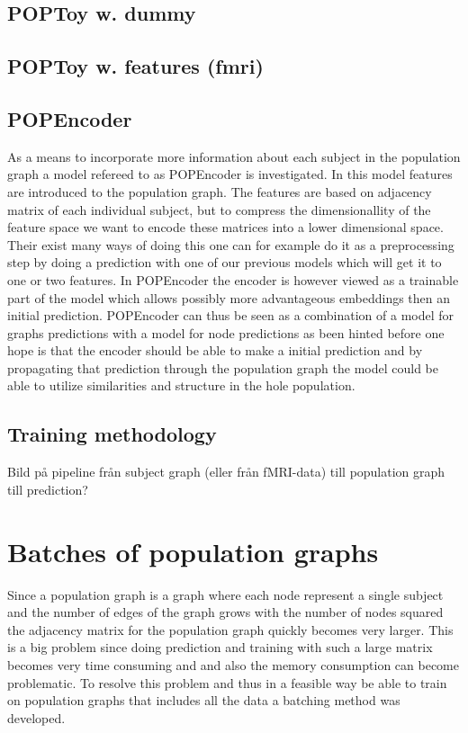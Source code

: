 \subsection{POPToy w. dummy}
\subsection{POPToy w. features (fmri)}
\subsection{POPEncoder}
As a means to incorporate more information about each subject in the population graph a model refereed to as POPEncoder is investigated. In this model features are introduced to the population graph. The features are based on adjacency matrix of each individual subject, but to compress the dimensionallity of the feature space we want to encode these matrices into a lower dimensional space. Their exist many ways of doing this one can for example do it as a preprocessing step by doing a prediction with one of our previous models which will get it to one or two features. In POPEncoder the encoder is however viewed as a trainable part of the model which allows possibly more advantageous embeddings then an initial prediction. POPEncoder can thus be seen as a combination of a model for graphs predictions with a model for node predictions as been hinted before one hope is that the encoder should be able to make a initial prediction and by propagating that prediction through the population graph the model could be able to utilize similarities and structure in the hole population.

\subsection{Training methodology} %
Bild på pipeline från subject graph (eller från fMRI-data) till population graph till prediction?

\section{Batches of population graphs}
Since a population graph is a graph where each node represent a single subject and the number of edges of the graph grows with the number of nodes squared the adjacency matrix for the population graph quickly becomes very larger. This is a big problem since doing prediction and training with such a large matrix becomes very time consuming and and also the memory consumption can become problematic. To resolve this problem and thus in a feasible way be able to train on population graphs that includes all the data a batching method was developed. 

